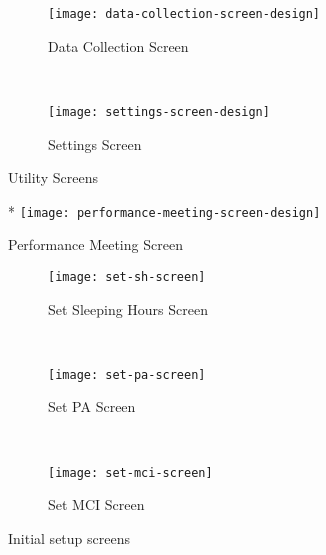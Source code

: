 \begin{figure*}[ht]
    \centering
    \begin{subfigure}[t]{0.4\textwidth}
        \centering
        \texttt{[image: data-collection-screen-design]}
        \caption{Data Collection Screen}
        \label{fig:data-collection-screen-design}
    \end{subfigure}%
    ~ 
    \begin{subfigure}[t]{0.4\textwidth}
        \centering
        \texttt{[image: settings-screen-design]}
        \caption{Settings Screen}
    \end{subfigure}
    \caption{Utility Screens}
\end{figure*}


\begin{figure}*
    \centering
    \texttt{[image: performance-meeting-screen-design]}
    \caption{Performance Meeting Screen}
    \label{fig:performance-meeting-screen-design}
\end{figure}

\begin{figure*}[ht]
    \centering
    \begin{subfigure}[t]{0.4\textwidth}
        \centering
        \texttt{[image: set-sh-screen]}
        \caption{Set Sleeping Hours Screen}
    \end{subfigure}%
    ~ 
    \begin{subfigure}[t]{0.4\textwidth}
        \centering
        \texttt{[image: set-pa-screen]}
        \caption{Set PA Screen}
    \end{subfigure}
    ~
     \begin{subfigure}[t]{0.4\textwidth}
        \centering
        \texttt{[image: set-mci-screen]}
        \caption{Set MCI Screen}
    \end{subfigure}
    \caption{Initial setup screens}
    \label{fig:initial-setup-screens}
\end{figure*}

